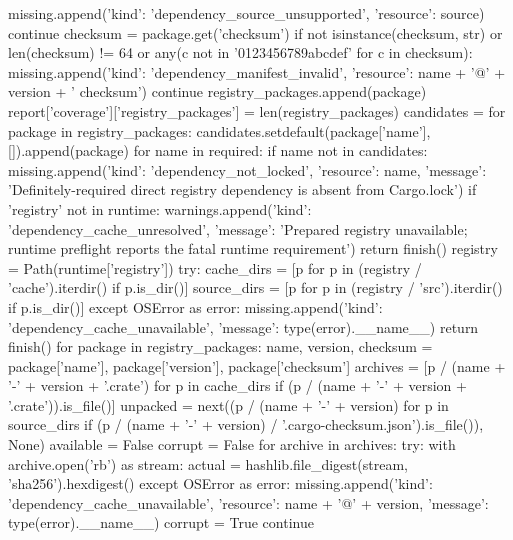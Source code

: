                 missing.append({'kind': 'dependency_source_unsupported', 'resource': source})
                continue
            checksum = package.get('checksum')
            if not isinstance(checksum, str) or len(checksum) != 64 or any(c not in '0123456789abcdef' for c in checksum):
                missing.append({'kind': 'dependency_manifest_invalid', 'resource': name + '@' + version + ' checksum'})
                continue
            registry_packages.append(package)
        report['coverage']['registry_packages'] = len(registry_packages)
        candidates = {}
        for package in registry_packages:
            candidates.setdefault(package['name'], []).append(package)
        for name in required:
            if name not in candidates:
                missing.append({'kind': 'dependency_not_locked', 'resource': name,
                                'message': 'Definitely-required direct registry dependency is absent from Cargo.lock'})
        if 'registry' not in runtime:
            warnings.append({'kind': 'dependency_cache_unresolved', 'message': 'Prepared registry unavailable; runtime preflight reports the fatal runtime requirement'})
            return finish()
        registry = Path(runtime['registry'])
        try:
            cache_dirs = [p for p in (registry / 'cache').iterdir() if p.is_dir()]
            source_dirs = [p for p in (registry / 'src').iterdir() if p.is_dir()]
        except OSError as error:
            missing.append({'kind': 'dependency_cache_unavailable', 'message': type(error).__name__})
            return finish()
        for package in registry_packages:
            name, version, checksum = package['name'], package['version'], package['checksum']
            archives = [p / (name + '-' + version + '.crate') for p in cache_dirs
                        if (p / (name + '-' + version + '.crate')).is_file()]
            unpacked = next((p / (name + '-' + version) for p in source_dirs
                             if (p / (name + '-' + version) / '.cargo-checksum.json').is_file()), None)
            available = False
            corrupt = False
            for archive in archives:
                try:
                    with archive.open('rb') as stream:
                        actual = hashlib.file_digest(stream, 'sha256').hexdigest()
                except OSError as error:
                    missing.append({'kind': 'dependency_cache_unavailable', 'resource': name + '@' + version,
                                    'message': type(error).__name__})
                    corrupt = True
                    continue
